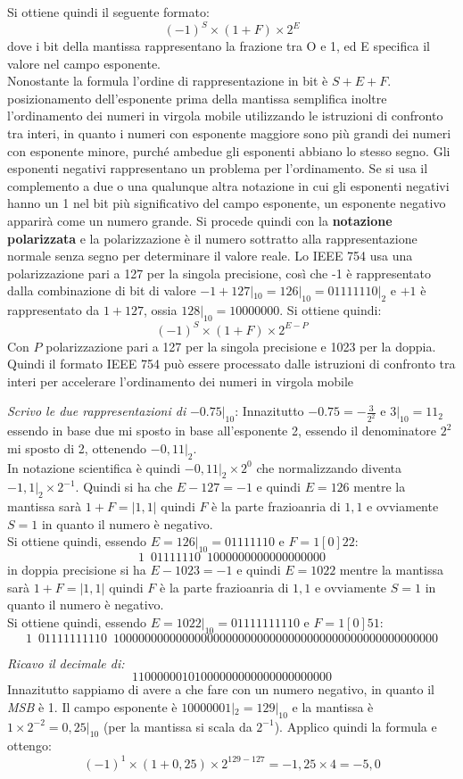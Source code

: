 \documentclass[a4paper,12pt, oneside]{book}
\begin{document}
Si ottiene quindi il seguente formato:
\[(-1)^S\times (1+F) \times 2^E\]
dove i bit della mantissa rappresentano la frazione tra O e 1, ed E specifica il valore nel campo esponente.\\
Nonostante la formula l'ordine di rappresentazione in bit è $S+ E +F$.\\
posizionamento dell'esponente prima della mantissa semplifica inoltre l'ordinamento dei numeri in virgola mobile utilizzando le istruzioni di confronto tra
interi, in quanto i numeri con esponente maggiore sono più grandi dei numeri con esponente minore, purché ambedue gli esponenti abbiano lo stesso segno.
Gli esponenti negativi rappresentano un problema per l'ordinamento. Se si usa il complemento a due o una qualunque altra notazione in cui gli esponenti negativi hanno un 1 nel bit più significativo del campo esponente, un esponente negativo apparirà come un numero grande. Si procede quindi con la \textbf{notazione polarizzata} e la polarizzazione è il numero sottratto alla rappresentazione normale senza segno per determinare il valore reale. Lo IEEE 754 usa una polarizzazione pari a 127 per la singola precisione, così che
-1 è rappresentato dalla combinazione di bit di valore $-1+127|_{10}=126|_{10}=01111110|_2 $ e $+1$ è rappresentato da $1+127$, ossia $128|_{10}=10000000$. Si ottiene quindi:
\[(-1)^S\times (1+F) \times 2^{E-P}\]
Con $P$ polarizzazione pari a 127 per la singola precisione e 1023 per la doppia. Quindi il formato IEEE 754 può essere processato dalle istruzioni di confronto tra interi per accelerare l'ordinamento dei numeri in virgola mobile
\begin{esempio}
\textit{Scrivo le due rappresentazioni di }$-0.75|_{10}$:
Innazitutto $-0.75 = -\frac{3}{2^2}$ e $3|_{10}=11_2$ essendo in base due mi sposto in base all'esponente 2, essendo il denominatore $2^2$ mi sposto di 2, ottenendo $-0,11|_2$.\\
In notazione scientifica è quindi $-0,11|_2\times 2^0$ che normalizzando diventa $-1,1|_2\times 2^{-1}$. Quindi si ha che $E-127 = -1$ e quindi $E=126$ mentre la mantissa sarà $1+F=|1,1|$ quindi $F$ è la parte frazioanria di $1,1$ e ovviamente $S=1$ in quanto il numero è negativo.\\
Si ottiene quindi, essendo $E=126|_{10}= 01111110$ e $F=1[0]{22}$:
\[1\,\,\,01111110\,\,\, 1000000000000000000 \]
in doppia precisione si ha $E-1023 = -1$ e quindi $E=1022$ mentre la mantissa sarà $1+F=|1,1|$ quindi $F$ è la parte frazioanria di $1,1$ e ovviamente $S=1$ in quanto il numero è negativo.\\
Si ottiene quindi, essendo $E=1022|_{10}= 01111111110$ e $F=1[0]{51}$:
\[1\,\,\,01111111110\,\,\, 1000000000000000000000000000000000000000000000000000 \]
\end{esempio}
\begin{esempio}
  \textit{Ricavo il decimale di:}
  \[1 10000001 01000000000000000000000\]
  Innazitutto sappiamo di avere a che fare con un numero negativo, in quanto il \textit{MSB} è 1. Il campo esponente è $10000001|_2 = 129|_{10}$ e la mantissa è $1\times 2^{-2} = 0,25|_{10}$ (per la mantissa si scala da $2^{-1}$). Applico quindi la formula e ottengo:
  \[(-1)^1 \times (1+0,25) \times 2^{129-127} = -1,25 \times 4 = -5,0\]
\end{esempio}
\end{document}
